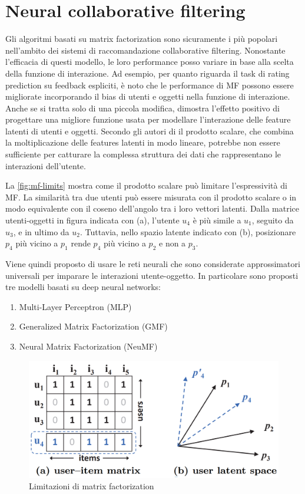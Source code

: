 \documentclass[12pt,italian]{report}
\begin{document}
\section{Neural collaborative filtering}
Gli algoritmi basati su matrix factorization sono sicuramente i più popolari nell'ambito dei sistemi di raccomandazione collaborative filtering. Nonostante l'efficacia di questi modello, le loro performance  posso variare in base alla scelta della funzione di interazione. Ad esempio, per quanto riguarda il task di rating prediction su feedback espliciti, è noto che le performance di MF possono essere migliorate incorporando il bias di utenti e oggetti nella funzione di interazione. Anche se si tratta solo di una piccola modifica, dimostra l'effetto positivo di progettare una migliore funzione usata per modellare l'interazione delle feature latenti di utenti e oggetti. 
Secondo gli autori di \cite{NCF} il prodotto scalare, che combina la moltiplicazione delle features latenti in modo lineare, potrebbe non essere sufficiente per catturare la complessa struttura dei dati che rappresentano le interazioni dell'utente. 

La \autoref{fig:mf-limits} mostra come il prodotto scalare può limitare l'espressività di MF. La similarità tra due utenti può essere misurata con il prodotto scalare o in modo equivalente con il coseno dell'angolo tra i loro vettori latenti. Dalla matrice utenti-oggetti in figura indicata con (a), l'utente $u_4$ è più simile a $u_1$, seguito da $u_3$, e in ultimo da $u_2$. Tuttavia, nello spazio latente indicato con (b), posizionare $p_4$ più vicino a $p_1$ rende $p_4$ più vicino a $p_2$ e non a $p_3$.

Viene quindi proposto di usare le reti neurali che sono considerate approssimatori universali \cite{NN-universal-approx} per imparare le interazioni utente-oggetto. In particolare sono proposti tre modelli basati su deep neural networks:
\begin{enumerate}
 \item Multi-Layer Perceptron (MLP)
 \item Generalized Matrix Factorization (GMF)
 \item Neural Matrix Factorization (NeuMF)
\end{enumerate}

\begin{figure}
  \includegraphics[width=\linewidth]{immagini/user_item_vectors.png}
  \caption{Limitazioni di matrix factorization}
  \label{fig:mf-limits}
\end{figure}
\end{document}
